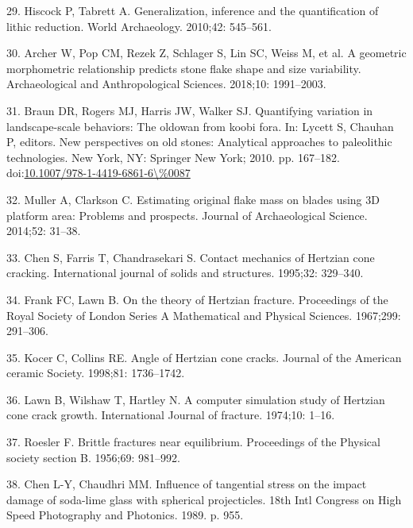 \documentclass[10pt,letterpaper]{article}
\newenvironment{cslreferences}%
  {}%
  {\par}
\begin{document}
\begin{cslreferences}
\leavevmode\hypertarget{ref-hiscock_generalization_2010}{}%
29. Hiscock P, Tabrett A. Generalization, inference and the
quantification of lithic reduction. World Archaeology. 2010;42:
545--561.

\leavevmode\hypertarget{ref-archer_geometric_2018}{}%
30. Archer W, Pop CM, Rezek Z, Schlager S, Lin SC, Weiss M, et al. A
geometric morphometric relationship predicts stone flake shape and size
variability. Archaeological and Anthropological Sciences. 2018;10:
1991--2003.

\leavevmode\hypertarget{ref-Braun2010}{}%
31. Braun DR, Rogers MJ, Harris JW, Walker SJ. Quantifying variation in
landscape-scale behaviors: The oldowan from koobi fora. In: Lycett S,
Chauhan P, editors. New perspectives on old stones: Analytical
approaches to paleolithic technologies. New York, NY: Springer New York;
2010. pp. 167--182.
doi:\href{https://doi.org/10.1007/978-1-4419-6861-6/\%0087}{10.1007/978-1-4419-6861-6\textbackslash\%0087}

\leavevmode\hypertarget{ref-muller_estimating_2014}{}%
32. Muller A, Clarkson C. Estimating original flake mass on blades using
3D platform area: Problems and prospects. Journal of Archaeological
Science. 2014;52: 31--38.

\leavevmode\hypertarget{ref-chen_contact_1995}{}%
33. Chen S, Farris T, Chandrasekari S. Contact mechanics of Hertzian
cone cracking. International journal of solids and structures. 1995;32:
329--340.

\leavevmode\hypertarget{ref-frank_theory_1967}{}%
34. Frank FC, Lawn B. On the theory of Hertzian fracture. Proceedings of
the Royal Society of London Series A Mathematical and Physical Sciences.
1967;299: 291--306.

\leavevmode\hypertarget{ref-kocer_angle_1998}{}%
35. Kocer C, Collins RE. Angle of Hertzian cone cracks. Journal of the
American ceramic Society. 1998;81: 1736--1742.

\leavevmode\hypertarget{ref-lawn_computer_1974}{}%
36. Lawn B, Wilshaw T, Hartley N. A computer simulation study of
Hertzian cone crack growth. International Journal of fracture. 1974;10:
1--16.

\leavevmode\hypertarget{ref-roesler_brittle_1956}{}%
37. Roesler F. Brittle fractures near equilibrium. Proceedings of the
Physical society section B. 1956;69: 981--992.

\leavevmode\hypertarget{ref-chen_influence_1989}{}%
38. Chen L-Y, Chaudhri MM. Influence of tangential stress on the impact
damage of soda-lime glass with spherical projecticles. 18th Intl
Congress on High Speed Photography and Photonics. 1989. p. 955.


\end{cslreferences}
\end{document}
